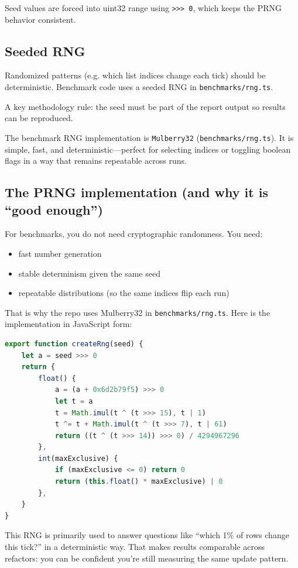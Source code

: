 Seed values are forced into uint32 range using \texttt{>>> 0}, which keeps the PRNG behavior consistent.

\subsection{Seeded RNG}

Randomized patterns (e.g. which list indices change each tick) should be deterministic.
Benchmark code uses a seeded RNG in \texttt{benchmarks/rng.ts}.

A key methodology rule: the seed must be part of the report output so results can be reproduced.

The benchmark RNG implementation is \texttt{Mulberry32} (\texttt{benchmarks/rng.ts}). It is simple, fast, and deterministic---perfect for selecting indices or toggling boolean flags in a way that remains repeatable across runs.

\subsection{The PRNG implementation (and why it is ``good enough'')}

For benchmarks, you do not need cryptographic randomness.
You need:

\begin{itemize}
\item fast number generation
\item stable determinism given the same seed
\item repeatable distributions (so the same indices flip each run)
\end{itemize}

That is why the repo uses Mulberry32 in \texttt{benchmarks/rng.ts}.
Here is the implementation in JavaScript form:

\begin{lstlisting}[language=JavaScript, caption={Mulberry32 PRNG used by benchmark cases (from \texttt{benchmarks/rng.ts}).}]
export function createRng(seed) {
	let a = seed >>> 0
	return {
		float() {
			a = (a + 0x6d2b79f5) >>> 0
			let t = a
			t = Math.imul(t ^ (t >>> 15), t | 1)
			t ^= t + Math.imul(t ^ (t >>> 7), t | 61)
			return ((t ^ (t >>> 14)) >>> 0) / 4294967296
		},
		int(maxExclusive) {
			if (maxExclusive <= 0) return 0
			return (this.float() * maxExclusive) | 0
		},
	}
}
\end{lstlisting}

This RNG is primarily used to answer questions like ``which 1\% of rows change this tick?'' in a deterministic way.
That makes results comparable across refactors: you can be confident you're still measuring the same update pattern.

